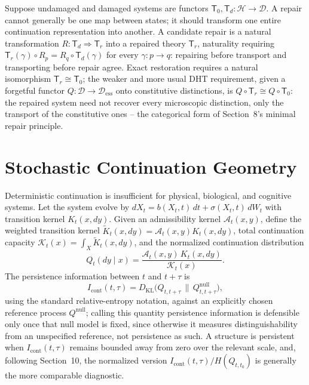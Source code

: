 \documentclass[11pt]{article}
\begin{document}
Suppose undamaged and damaged systems are functors $\mathsf{T}_0, \mathsf{T}_d : \mathcal{H} \to \mathcal{D}$. A repair cannot generally be one map between states; it should transform one entire continuation representation into another. A candidate repair is a natural transformation $R : \mathsf{T}_d \Rightarrow \mathsf{T}_r$ into a repaired theory $\mathsf{T}_r$, naturality requiring $\mathsf{T}_r(\gamma) \circ R_p = R_q \circ \mathsf{T}_d(\gamma)$ for every $\gamma : p \to q$: repairing before transport and transporting before repair agree. Exact restoration requires a natural isomorphism $\mathsf{T}_r \cong \mathsf{T}_0$; the weaker and more usual DHT requirement, given a forgetful functor $Q : \mathcal{D} \to \mathcal{D}_{\mathrm{ess}}$ onto constitutive distinctions, is $Q \circ \mathsf{T}_r \cong Q \circ \mathsf{T}_0$: the repaired system need not recover every microscopic distinction, only the transport of the constitutive ones -- the categorical form of Section~8's minimal repair principle.

\section{Stochastic Continuation Geometry}
\label{app:stochastic}

Deterministic continuation is insufficient for physical, biological, and cognitive systems. Let the system evolve by $dX_t = b(X_t,t)\, dt + \sigma(X_t,t)\, dW_t$ with transition kernel $K_t(x, dy)$. Given an admissibility kernel $\mathcal{A}_t(x,y)$, define the weighted transition kernel $\widetilde{K}_t(x, dy) = \mathcal{A}_t(x,y) K_t(x, dy)$, total continuation capacity $\mathcal{K}_t(x) = \int_X \widetilde{K}_t(x, dy)$, and the normalized continuation distribution
\[
Q_t(dy \mid x) = \frac{\mathcal{A}_t(x,y)\, K_t(x, dy)}{\mathcal{K}_t(x)}.
\]
The persistence information between $t$ and $t + \tau$ is
\[
I_{\mathrm{cont}}(t, \tau) = D_{\mathrm{KL}}\bigl( Q_{t, t+\tau} \,\big\|\, Q^{\mathrm{null}}_{t,t+\tau} \bigr),
\]
using the standard relative-entropy notation, against an explicitly chosen reference process $Q^{\mathrm{null}}$; calling this quantity persistence information is defensible only once that null model is fixed, since otherwise it measures distinguishability from an unspecified reference, not persistence as such. A structure is persistent when $I_{\mathrm{cont}}(t,\tau)$ remains bounded away from zero over the relevant scale, and, following Section~10, the normalized version $I_{\mathrm{cont}}(t,\tau)/H(Q_{t,t_0})$ is generally the more comparable diagnostic.
\end{document}

